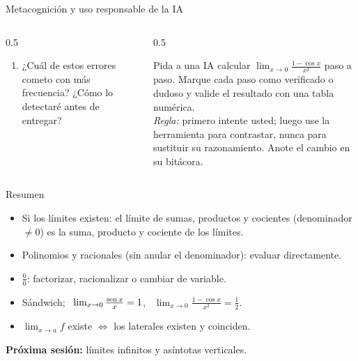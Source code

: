 \documentclass[10pt,aspectratio=169]{beamer}
\begin{document}
\begin{frame}{Metacognición y uso responsable de la IA}
  \small
  \begin{columns}[t]
    \begin{column}{0.5\textwidth}
      \begin{metacog}
        \begin{enumerate}
          \metacomun
          \item ¿Cuál de estos errores cometo con más frecuencia? ¿Cómo lo detectaré antes de entregar?
        \end{enumerate}
      \end{metacog}
    \end{column}
    \begin{column}{0.5\textwidth}
      \begin{iabox}
        Pida a una IA calcular $\lim_{x\to0}\frac{1-\cos x}{x^2}$ paso a paso. Marque cada paso como verificado o dudoso y valide el resultado con una tabla numérica.\\[2pt]
        \textit{Regla:} primero intente usted; luego use la herramienta para contrastar, nunca para sustituir su razonamiento. Anote el cambio en su bitácora.
      \end{iabox}
    \end{column}
  \end{columns}
\end{frame}

\begin{frame}{Resumen}
  \begin{itemize}
    \item Si los límites existen: el límite de sumas, productos y cocientes (denominador $\neq0$) es la suma, producto y cociente de los límites.
    \item Polinomios y racionales (sin anular el denominador): evaluar directamente.
    \item $\frac00$: factorizar, racionalizar o cambiar de variable.
    \item Sándwich; \ $\lim_{x\to0}\frac{\operatorname{sen} x}{x}=1$, \ $\lim_{x\to0}\frac{1-\cos x}{x^2}=\frac12$.
    \item $\lim_{x\to a}f$ existe $\iff$ los laterales existen y coinciden.
  \end{itemize}
  \vspace{3mm}
  \textbf{Próxima sesión:} límites infinitos y asíntotas verticales.
\end{frame}
\end{document}
